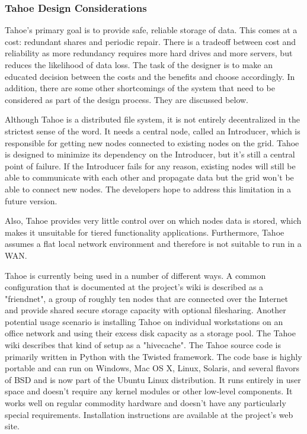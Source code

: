 \documentclass[11pt]{article}
\begin{document}
\subsubsection{Tahoe Design Considerations}
Tahoe's primary goal is to provide safe, reliable storage of data. This comes 
at a cost: redundant shares and periodic repair. There is a tradeoff between 
cost and reliability as more redundancy requires more hard drives and more 
servers, but reduces the likelihood of data loss. The task of the designer 
is to make an educated decision between the costs and the benefits and 
choose accordingly. In addition, there are some other shortcomings of the 
system that need to be considered as part of the design process. They are 
discussed below.

Although Tahoe is a distributed file system, it is not entirely 
decentralized in the strictest sense of the word. It needs a central node, 
called an Introducer, which is responsible for getting new nodes connected 
to existing nodes on the grid. Tahoe is designed to minimize its dependency 
on the Introducer, but it's still a central point of failure. If the 
Introducer fails for any reason, existing nodes will still be able to 
communicate with each other and propagate data but the grid won't be able 
to connect new nodes. The developers hope to address this limitation in a 
future version.

Also, Tahoe provides very little control over on which nodes data is stored, 
which makes it unsuitable for tiered functionality applications. 
Furthermore, Tahoe assumes a flat local network environment and 
therefore is not suitable to run in a WAN. 

Tahoe is currently being used in a number of different ways. A common 
configuration that is documented at the project's wiki is described as a 
"friendnet", a group of roughly ten nodes that are connected over the 
Internet and provide shared secure storage capacity with optional 
filesharing. Another potential usage scenario is installing Tahoe on 
individual workstations on an office network and using their excess disk 
capacity as a storage pool. The Tahoe wiki describes that kind of setup 
as a "hivecache". The Tahoe source code is primarily written in Python 
with the Twisted framework. The code base is highly portable and can 
run on Windows, Mac OS X, Linux, Solaris, and several flavors of BSD and 
is now part of the Ubuntu Linux distribution. It runs entirely in user 
space and doesn't require any kernel modules or other low-level components. 
It works well on regular commodity hardware and doesn't have any 
particularly special requirements. Installation instructions are available 
at the project's web site.
\end{document}
